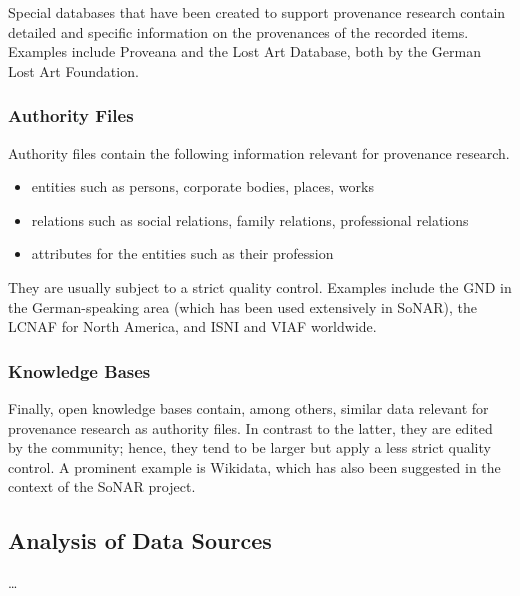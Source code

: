 Special databases that have been created to support provenance research contain detailed and specific information on
the provenances of the recorded items.
Examples include Proveana and the Lost Art Database, both by the German Lost Art Foundation. 

\subsubsection{Authority Files}

Authority files contain the following information relevant for provenance research.
%
\begin{itemize}
  \item
    entities such as persons, corporate bodies, places, works
  \item
    relations such as social relations, family relations, professional relations
  \item
    attributes for the entities such as their profession
\end{itemize}
%
They are usually subject to a strict quality control.
Examples include the \gls{GND} in the German-speaking area (which has been used extensively in \gls{SoNAR}),
the \gls{LCNAF} for North America,
and \gls{ISNI} and \gls{VIAF} worldwide.

\subsubsection{Knowledge Bases}

Finally, open knowledge bases contain, among others, similar data relevant for provenance research as authority files.
In contrast to the latter, they are edited by the community; hence, they tend to be larger but apply
a less strict quality control. A prominent example is Wikidata, which has also been suggested in the context of the \gls{SoNAR} project.

\subsection{Analysis of Data Sources}

\dots

\par\bigskip
{}

